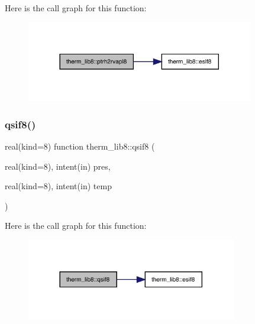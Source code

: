 Here is the call graph for this function\+:
\nopagebreak
\begin{figure}[H]
\begin{center}
\leavevmode
\includegraphics[width=281pt]{namespacetherm__lib8_a1369aae8fe00b751c008902b167f212b_cgraph}
\end{center}
\end{figure}
\mbox{\label{namespacetherm__lib8_a7b40fbdb54ace8154fe028b1c730dd72}} 
\subsubsection{\texorpdfstring{qsif8()}{qsif8()}}
{\footnotesize\ttfamily real(kind=8) function therm\+\_\+lib8\+::qsif8 (\begin{DoxyParamCaption}\item[{real(kind=8), intent(in)}]{pres,  }\item[{real(kind=8), intent(in)}]{temp }\end{DoxyParamCaption})}

Here is the call graph for this function\+:
\nopagebreak
\begin{figure}[H]
\begin{center}
\leavevmode
\includegraphics[width=260pt]{namespacetherm__lib8_a7b40fbdb54ace8154fe028b1c730dd72_cgraph}
\end{center}
\end{figure}
\mbox{\label{namespacetherm__lib8_a91c0c02e09a53dfba149bcb4b83d13f6}} 
